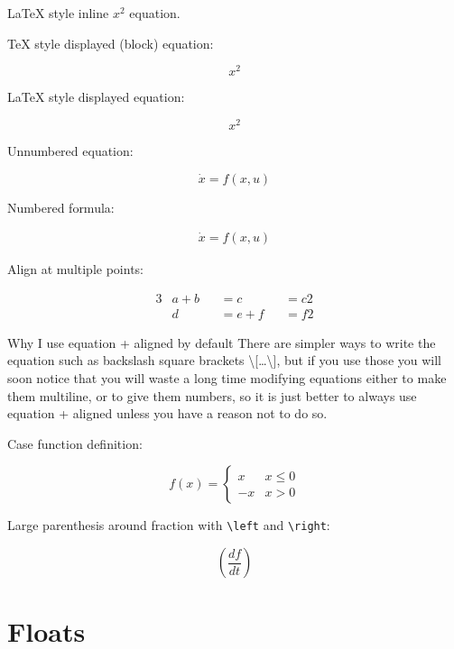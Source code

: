 \documentclass[12pt]{article}
\begin{document}
  LaTeX style inline \(x^2\) equation.

  TeX style displayed (block) equation:

  $$x^2$$

  LaTeX style displayed equation:

  \[ x^2 \]

  Unnumbered equation:

  \begin{equation*}
    \dot{x} = f(x,u)
  \end{equation*}

  Numbered formula:

  \begin{equation}\begin{aligned}\label{eqFor1}
    \dot{x} = f(x,u)
  \end{aligned}\end{equation}

  Align at multiple points:

      \begin{alignat*}{3}
        & a + b && = c   && = c2 \\
        & d   && = e + f && = f2
      \end{alignat*}

  \begin{remark}\label{remFor1} Why I use equation + aligned by default
    There are simpler ways to write the equation such as backslash square brackets \textbackslash{}[\ldots\textbackslash{}],
    but if you use those you will soon notice that you will waste a long time modifying equations
    either to make them multiline, or to give them numbers, so it is just better to always use
    equation + aligned unless you have a reason not to do so.
  \end{remark}

  Case function definition:

  \begin{equation}
    f(x) =
    \begin{cases}
      x & x \le 0 \\
      -x & x>0
    \end{cases}
  \end{equation}

  Large parenthesis around fraction with \lstinline|\left| and \lstinline|\right|:

  \[ \left(\frac{df}{dt}\right) \]

\section{Floats}\label{floats}
\end{document}
